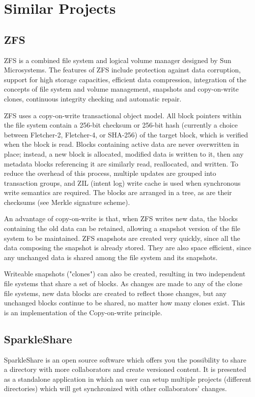 \section{Similar Projects}
    \subsection{ZFS}
        ZFS is a combined file system and logical volume manager designed by Sun Microsystems. The features of ZFS include protection against data corruption, support for high storage capacities, efficient data compression, integration of the concepts of file system and volume management, snapshots and copy-on-write clones, continuous integrity checking and automatic repair.
        
        ZFS uses a copy-on-write transactional object model. All block pointers within the file system contain a 256-bit checksum or 256-bit hash (currently a choice between Fletcher-2, Fletcher-4, or SHA-256) of the target block, which is verified when the block is read. Blocks containing active data are never overwritten in place; instead, a new block is allocated, modified data is written to it, then any metadata blocks referencing it are similarly read, reallocated, and written. To reduce the overhead of this process, multiple updates are grouped into transaction groups, and ZIL (intent log) write cache is used when synchronous write semantics are required. The blocks are arranged in a tree, as are their checksums (see Merkle signature scheme).
        
        An advantage of copy-on-write is that, when ZFS writes new data, the blocks containing the old data can be retained, allowing a snapshot version of the file system to be maintained. ZFS snapshots are created very quickly, since all the data composing the snapshot is already stored. They are also space efficient, since any unchanged data is shared among the file system and its snapshots.

        Writeable snapshots ("clones") can also be created, resulting in two independent file systems that share a set of blocks. As changes are made to any of the clone file systems, new data blocks are created to reflect those changes, but any unchanged blocks continue to be shared, no matter how many clones exist. This is an implementation of the Copy-on-write principle.
        
    \subsection{SparkleShare}
        SparkleShare is an open source software which offers you the possibility to share a directory with more collaborators and create versioned content. It is presented as a standalone application in which an user can setup multiple projects (different directories) which will get synchronized with other collaborators' changes.
        
